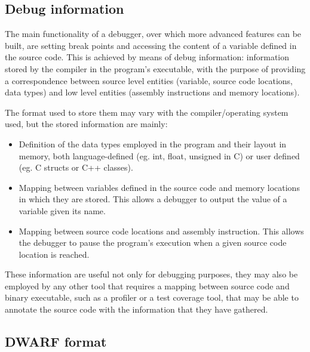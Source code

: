 \subsection{Debug information}
The main functionality of a debugger, over which more advanced features can be built, are setting break points and accessing the content of a variable defined in the source code. \newline 
This is achieved by means of debug information: information stored by the compiler in the program's executable, with the purpose of providing a correspondence between source level entities (variable, source code locations, data types) and low level entities (assembly instructions and memory locations). \par
The format used to store them may vary with the compiler/operating system used, but the stored information are mainly:
\begin{itemize}
\item Definition of the data types employed in the program and their layout in memory, both language-defined (eg. int, float, unsigned in C) or user defined (eg. C structs or C++ classes). 
\item Mapping between variables defined in the source code and memory locations in which they are stored. This allows a debugger to output the value of a variable given its name.
\item Mapping between source code locations and assembly instruction. This allows the debugger to pause the program's execution when a given source code location is reached.
\end{itemize}
These information are useful not only for debugging purposes, they may also be employed by any other tool that requires a mapping between source code and binary executable, such as a profiler or a test coverage tool, that may be able to annotate the source code with the information that they have gathered.

\subsection{DWARF format\label{sec:dwarfsec}}

